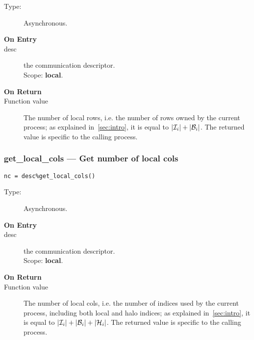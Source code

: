 \begin{description}
\item[Type:] Asynchronous.
\item[\bf On Entry]
\item[desc] the communication descriptor.\\
Scope: {\bf local}.\\
\end{description}

\begin{description}
\item[\bf On Return]
\item[Function value] The number of local rows, i.e. the number of
  rows owned by the current process; as explained in~\ref{sec:intro},
  it is equal to $|{\cal I}_i| + |{\cal B}_i|$. The returned value is
  specific to the calling process. 
\end{description}


\subsubsection{get\_local\_cols --- Get number of local cols}

\begin{verbatim}
nc = desc%get_local_cols()
\end{verbatim}

\begin{description}
\item[Type:] Asynchronous.
\item[\bf On Entry]
\item[desc] the communication descriptor.\\
Scope: {\bf local}.\\
\end{description}

\begin{description}
\item[\bf On Return]
\item[Function value] The number of local cols, i.e. the number of
  indices used by the current process, including both local and halo
  indices; as explained in~\ref{sec:intro}, 
  it is equal to  $|{\cal I}_i| + |{\cal B}_i| +|{\cal H}_i|$. The
  returned value is specific to the calling process. 
\end{description}


